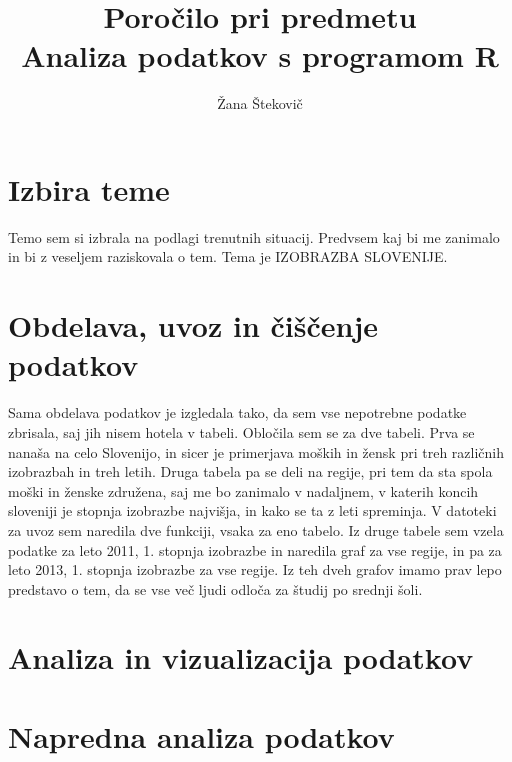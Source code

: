 \documentclass[11pt,a4paper]{article}
\begin{document}
\title{Poročilo pri predmetu \\
Analiza podatkov s programom R}
\author{Žana Štekovič}
\maketitle

\section{Izbira teme}
Temo sem si izbrala na podlagi trenutnih situacij. Predvsem kaj bi me zanimalo in bi z veseljem raziskovala o tem.
Tema je IZOBRAZBA SLOVENIJE.

\section{Obdelava, uvoz in čiščenje podatkov}
Sama obdelava podatkov je izgledala tako, da sem vse nepotrebne podatke zbrisala, saj jih nisem hotela v tabeli. Obločila sem se za dve tabeli. Prva se nanaša na celo Slovenijo, in sicer je primerjava moških in žensk pri treh različnih izobrazbah in treh letih. Druga tabela pa se deli na regije, pri tem da sta spola moški in ženske združena, saj me bo zanimalo v nadaljnem, v katerih koncih sloveniji je stopnja izobrazbe najvišja, in kako se ta z leti spreminja.
V datoteki za uvoz sem naredila dve funkciji, vsaka za eno tabelo. Iz druge tabele sem vzela podatke za leto 2011, 1. stopnja izobrazbe in naredila graf za vse regije, in pa za leto 2013, 1. stopnja izobrazbe za vse regije. Iz teh dveh grafov imamo prav lepo predstavo o tem, da se vse več ljudi odloča za študij po srednji šoli.
\section{Analiza in vizualizacija podatkov}


\section{Napredna analiza podatkov}

\end{document}
